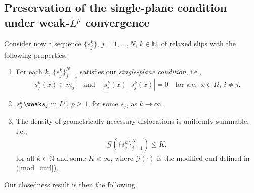 \documentclass[11pt,reqno]{amsart}
\theoremstyle{plain}
\theoremstyle{definition}
\theoremstyle{remark}
\begin{document}
\subsection{Preservation of the single-plane condition under weak-$L^p$ convergence}

Consider now a sequence $\{s_j^k\}$, $j=1,\ldots,N$, $k\in\mathbb{N}$, of relaxed slips with the following properties: 
\begin{enumerate}[(P1)]
\item \label{enum:bjsecond} For each $k$, $\{s_j^k\}_{j=1}^N$ satisfies our \emph{single-plane condition}, i.e.,
\[s_j^k(x)\in m_j^{\perp}\quad\textrm{and}\quad |s_i^k(x)||s_j^k(x)|=0\quad\textrm{for a.e. }~x\in\Omega,~i\neq j.
\]	
\item\label{enum:bjfirst} $s_j^k \weak s_j$ in $L^p$, $p\ge 1$, for some $s_j$, as $k\rightarrow\infty$.
\item \label{enum:bjlast} The density of geometrically necessary dislocations is uniformly summable, i.e.,
\begin{align*}
\mathcal{G}(\{s_j^k\}_{j=1}^N)\leq K,
\end{align*}
for all $k\in\mathbb{N}$ and some $K<\infty$, where $\mathcal{G}(\cdot)$ is the modified curl defined in (\ref{mod_curl}). 
\end{enumerate}

Our closedness result is then the following.
\end{document}
